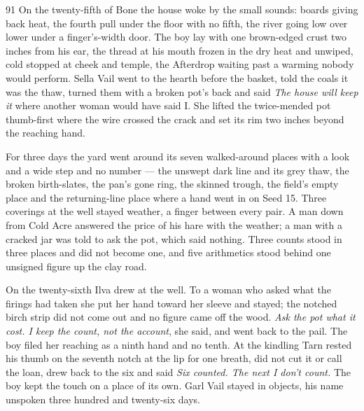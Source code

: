 
\scenebreak


\scenebreak


\scenebreak

\CRtailpiece
\begin{CRchronicle}{91}
On the twenty-fifth of Bone the house woke by the small sounds: boards giving back heat, the fourth pull under the floor with no fifth, the river going low over lower under a finger’s-width door. The boy lay with one brown-edged crust two inches from his ear, the thread at his mouth frozen in the dry heat and unwiped, cold stopped at cheek and temple, the Afterdrop waiting past a warming nobody would perform. Sella Vail went to the hearth before the basket, told the coals it was the thaw, turned them with a broken pot’s back and said \emph{The house will keep it} where another woman would have said I. She lifted the twice-mended pot thumb-first where the wire crossed the crack and set its rim two inches beyond the reaching hand.

For three days the yard went around its seven walked-around places with a look and a wide step and no number --- the unswept dark line and its grey thaw, the broken birth-slates, the pan’s gone ring, the skinned trough, the field’s empty place and the returning-line place where a hand went in on Seed 15. Three coverings at the well stayed weather, a finger between every pair. A man down from Cold Acre answered the price of his hare with the weather; a man with a cracked jar was told to ask the pot, which said nothing. Three counts stood in three places and did not become one, and five arithmetics stood behind one unsigned figure up the clay road.

On the twenty-sixth Ilva drew at the well. To a woman who asked what the firings had taken she put her hand toward her sleeve and stayed; the notched birch strip did not come out and no figure came off the wood. \emph{Ask the pot what it cost. I keep the count, not the account}, she said, and went back to the pail. The boy filed her reaching as a ninth hand and no tenth. At the kindling Tarn rested his thumb on the seventh notch at the lip for one breath, did not cut it or call the loan, drew back to the six and said \emph{Six counted. The next I don’t count.} The boy kept the touch on a place of its own. Garl Vail stayed in objects, his name unspoken three hundred and twenty-six days.


\end{CRchronicle}
